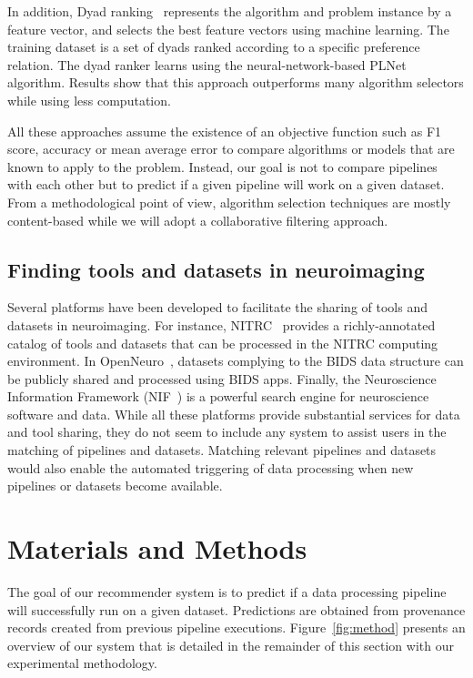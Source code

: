 In addition, Dyad ranking~\cite{tornede2019algorithm,tornede2020extreme} represents the algorithm and problem instance by a feature vector, and selects the best feature vectors using machine learning. The training dataset is a set of dyads ranked according to a specific preference relation. The dyad ranker learns using the neural-network-based PLNet~\cite{schafer2018dyad} algorithm. Results show that this approach outperforms many algorithm selectors while using less computation. 

All these approaches assume the existence of an objective function such as F1 score, accuracy or mean average error to compare algorithms or models that are known to apply to the problem. Instead, our goal is not to compare pipelines with each other but to predict if a given pipeline will work on a given dataset. From a methodological point of view, algorithm selection techniques are mostly content-based  while we will adopt a collaborative filtering approach.

\subsection{Finding tools and datasets in neuroimaging}

Several platforms have been developed to facilitate the sharing of tools and datasets 
in neuroimaging. For instance, NITRC~\cite{kennedy2016nitrc} provides a richly-annotated catalog of tools and datasets that can be processed in the NITRC computing environment. In OpenNeuro~\cite{markiewicz2021openneuro}, datasets complying to the BIDS data structure can be publicly shared and processed using BIDS apps.  Finally, the Neuroscience Information Framework (NIF~\cite{gardner2008neuroscience}) is a powerful search engine for neuroscience software and data. While all these platforms provide substantial services for data and tool sharing, they do not seem to include any system to assist users in the matching of pipelines and datasets. Matching relevant pipelines and datasets would also enable the automated triggering of data processing when new pipelines or datasets become available. 

\section{Materials and Methods}

The goal of our recommender system is to predict if a data processing
pipeline will successfully run on a given dataset. Predictions are obtained
from provenance records created from previous pipeline executions.
Figure~\ref{fig:method} presents an overview of our system that is detailed
in the remainder of this section with our experimental methodology.

